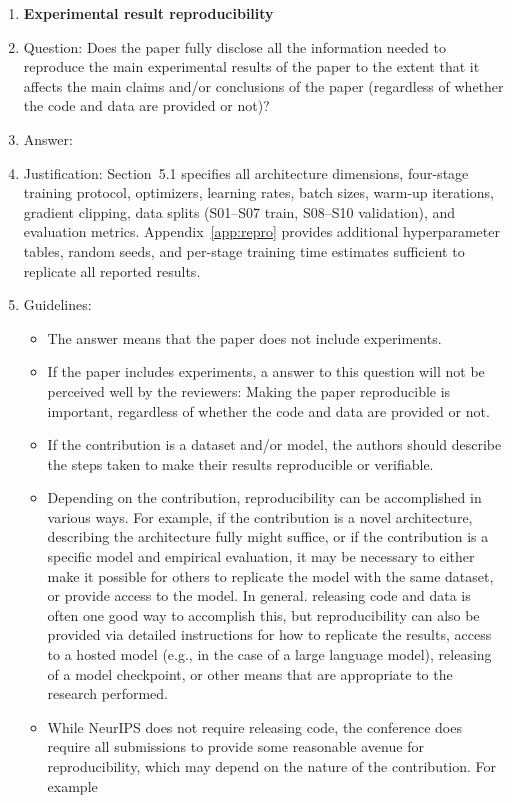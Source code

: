 \begin{enumerate}
    \item {\bf Experimental result reproducibility}
    \item[] Question: Does the paper fully disclose all the information needed to reproduce the main experimental results of the paper to the extent that it affects the main claims and/or conclusions of the paper (regardless of whether the code and data are provided or not)?
    \item[] Answer: \answerYes{}
    \item[] Justification: Section~5.1 specifies all architecture dimensions, four-stage training protocol, optimizers, learning rates, batch sizes, warm-up iterations, gradient clipping, data splits (S01--S07 train, S08--S10 validation), and evaluation metrics. Appendix~\ref{app:repro} provides additional hyperparameter tables, random seeds, and per-stage training time estimates sufficient to replicate all reported results.
    \item[] Guidelines:
    \begin{itemize}
        \item The answer \answerNA{} means that the paper does not include experiments.
        \item If the paper includes experiments, a \answerNo{} answer to this question will not be perceived well by the reviewers: Making the paper reproducible is important, regardless of whether the code and data are provided or not.
        \item If the contribution is a dataset and\slash or model, the authors should describe the steps taken to make their results reproducible or verifiable.
        \item Depending on the contribution, reproducibility can be accomplished in various ways. For example, if the contribution is a novel architecture, describing the architecture fully might suffice, or if the contribution is a specific model and empirical evaluation, it may be necessary to either make it possible for others to replicate the model with the same dataset, or provide access to the model. In general. releasing code and data is often one good way to accomplish this, but reproducibility can also be provided via detailed instructions for how to replicate the results, access to a hosted model (e.g., in the case of a large language model), releasing of a model checkpoint, or other means that are appropriate to the research performed.
        \item While NeurIPS does not require releasing code, the conference does require all submissions to provide some reasonable avenue for reproducibility, which may depend on the nature of the contribution. For example

\end{itemize}
\end{enumerate}
